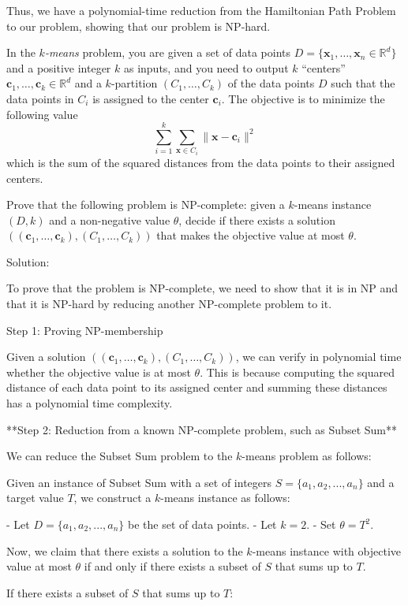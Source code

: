 \documentclass{oxmathproblems}
\begin{document}
\begin{questions}
Thus, we have a polynomial-time reduction from the Hamiltonian Path Problem to our problem, showing that our problem is NP-hard.

\miquestion[50]
In the \emph{$k$-means} problem, you are given a set of data points $D=\{\mathbf{x}_1,\ldots,\mathbf{x}_n\in\mathbb{R}^d\}$ and a positive integer $k$ as inputs, and you need to output $k$ ``centers'' $\mathbf{c}_1,\ldots,\mathbf{c}_k\in\mathbb{R}^d$ and a $k$-partition $(C_1,\ldots,C_k)$ of the data points $D$ such that the data points in $C_i$ is assigned to the center $\mathbf{c}_i$.
The objective is to minimize the following value
$$\sum_{i=1}^k\sum_{\mathbf{x}\in C_i}\|\mathbf{x}-\mathbf{c}_i\|^2$$
which is the sum of the squared distances from the data points to their assigned centers.

Prove that the following problem is NP-complete:
given a $k$-means instance $(D,k)$ and a non-negative value $\theta$, decide if there exists a solution $((\mathbf{c}_1,\ldots,\mathbf{c}_k),(C_1,\ldots,C_k))$ that makes the objective value at most $\theta$.

Solution:

To prove that the problem is NP-complete, we need to show that it is in NP and that it is NP-hard by reducing another NP-complete problem to it. 

Step 1: Proving NP-membership

Given a solution $((\mathbf{c}_1,\ldots,\mathbf{c}_k),(C_1,\ldots,C_k))$, we can verify in polynomial time whether the objective value is at most $\theta$. This is because computing the squared distance of each data point to its assigned center and summing these distances has a polynomial time complexity.

**Step 2: Reduction from a known NP-complete problem, such as Subset Sum**

We can reduce the Subset Sum problem to the $k$-means problem as follows:

Given an instance of Subset Sum with a set of integers $S=\{a_1, a_2, ..., a_n\}$ and a target value $T$, we construct a $k$-means instance as follows:

- Let $D = \{a_1, a_2, ..., a_n\}$ be the set of data points.
- Let $k = 2$.
- Set $\theta = T^2$.

Now, we claim that there exists a solution to the $k$-means instance with objective value at most $\theta$ if and only if there exists a subset of $S$ that sums up to $T$.

If there exists a subset of $S$ that sums up to $T$:


\end{questions}
\end{document}
